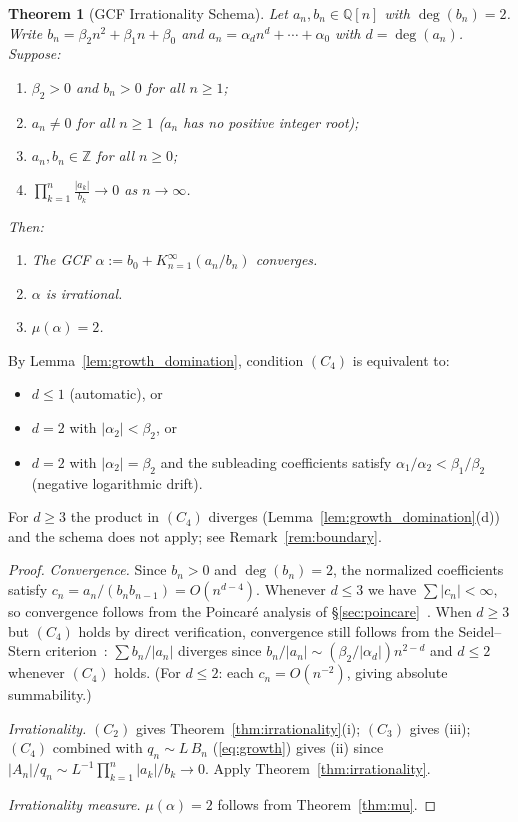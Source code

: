 \documentclass[11pt,a4paper]{article}
\newtheorem{theorem}{Theorem}
\theoremstyle{definition}
\theoremstyle{remark}
\newcommand{\abs}[1]{\lvert #1 \rvert}
\begin{document}
\begin{theorem}[GCF Irrationality Schema]\label{thm:master}
Let $a_n, b_n \in \mathbb{Q}[n]$ with $\deg(b_n) = 2$.
Write $b_n = \beta_2 n^2 + \beta_1 n + \beta_0$ and
$a_n = \alpha_d n^d + \cdots + \alpha_0$ with $d = \deg(a_n)$.
Suppose:
\begin{enumerate}
  \item[$(C_1)$] $\beta_2 > 0$ and $b_n > 0$ for all $n \geq 1$;
  \item[$(C_2)$] $a_n \neq 0$ for all $n \geq 1$
        \textup{(}$a_n$ has no positive integer root\textup{)};
  \item[$(C_3)$] $a_n, b_n \in \mathbb{Z}$ for all $n \geq 0$;
  \item[$(C_4)$] $\displaystyle\prod_{k=1}^n \frac{\abs{a_k}}{b_k} \to 0$
        as $n \to \infty$.
\end{enumerate}
Then:
\begin{enumerate}
  \item The GCF $\alpha := b_0 + K_{n=1}^{\infty}(a_n/b_n)$ converges.
  \item $\alpha$ is irrational.
  \item $\mu(\alpha) = 2$.
\end{enumerate}
\end{theorem}

By Lemma~\ref{lem:growth_domination}, condition $(C_4)$ is equivalent to:
\begin{itemize}
\item $d \leq 1$ \textup{(}automatic\textup{)}, or
\item $d = 2$ with $\abs{\alpha_2} < \beta_2$, or
\item $d = 2$ with $\abs{\alpha_2} = \beta_2$
      and the subleading coefficients satisfy
      $\alpha_1/\alpha_2 < \beta_1/\beta_2$
      \textup{(}negative logarithmic drift\textup{)}.
\end{itemize}
For $d \geq 3$ the product in $(C_4)$ diverges
(Lemma~\ref{lem:growth_domination}(d)) and the schema does not apply;
see Remark~\ref{rem:boundary}.

\begin{proof}
\emph{Convergence.}  Since $b_n > 0$ and $\deg(b_n) = 2$,
the normalized coefficients satisfy
$c_n = a_n / (b_n b_{n-1}) = O(n^{d-4})$.
Whenever $d \leq 3$ we have $\sum \abs{c_n} < \infty$, so convergence
follows from the Poincar\'e analysis of
\S\ref{sec:poincare}~\cite{perron1929,pituk2002}.
When $d \geq 3$ but $(C_4)$ holds by direct verification,
convergence still follows from the Seidel--Stern
criterion~\cite{lorentzen2008}: $\sum b_n / \abs{a_n}$ diverges
since $b_n / \abs{a_n} \sim (\beta_2/\abs{\alpha_d}) n^{2-d}$
and $d \leq 2$ whenever $(C_4)$ holds.
(For $d \leq 2$: each $c_n = O(n^{-2})$, giving absolute summability.)

\emph{Irrationality.} $(C_2)$ gives Theorem~\ref{thm:irrationality}(i);
$(C_3)$ gives (iii); $(C_4)$ combined with $q_n \sim L\, B_n$
(\eqref{eq:growth}) gives (ii) since
$\abs{A_n}/q_n \sim L^{-1}\prod_{k=1}^n \abs{a_k}/b_k \to 0$.
Apply Theorem~\ref{thm:irrationality}.

\emph{Irrationality measure.}
$\mu(\alpha) = 2$ follows from Theorem~\ref{thm:mu}.
\end{proof}
\end{document}

